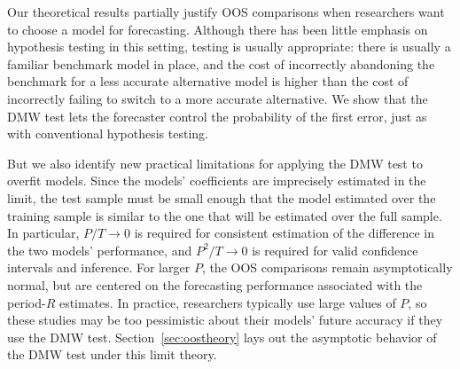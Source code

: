 \documentclass[12pt]{article}
\begin{document}
Our theoretical results partially justify OOS comparisons when
researchers want to
choose a model for forecasting.  Although there has been little
emphasis on hypothesis testing in this setting, testing is usually
appropriate: there is usually a familiar benchmark model in place, and
the cost of incorrectly abandoning the benchmark for a less accurate
alternative model is higher than the cost of incorrectly failing to
switch to a more accurate alternative.  We show that the DMW test
lets the forecaster control the probability of the first error, just
as with conventional hypothesis testing.

But we also identify new practical limitations for applying the DMW
test to overfit models.
Since the models' coefficients are imprecisely estimated in the limit,
the test sample must be small enough that the model estimated over the
training sample is similar to the one that will be estimated over the
full sample.  In particular, $P/T \to 0$ is required for consistent
estimation of the difference in the two models' performance,
and $P^2/T \to 0$ is required for valid confidence
intervals and inference.  For larger $P$, the OOS comparisons remain
asymptotically normal, but are centered on the forecasting performance
associated with the period-$R$ estimates.  In practice, researchers
typically use large values of $P$, so these studies may be too
pessimistic about their models' future accuracy if they use the DMW
test.  Section~\ref{sec:oostheory} lays out the asymptotic behavior of
the DMW test under this limit theory.
\end{document}
